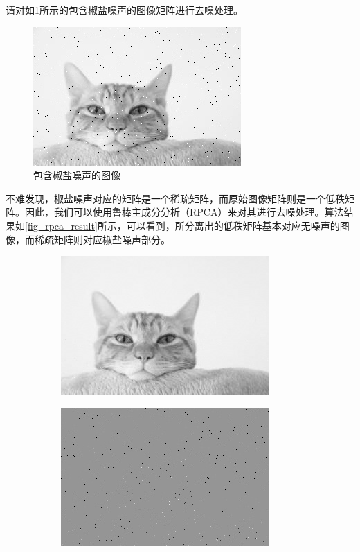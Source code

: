 \begin{example}
    请对如\cref{fig_rpca_example}所示的包含椒盐噪声的图像矩阵进行去噪处理。
    \begin{figure}[htb!]
        \centering
        \includegraphics[width=.3\textwidth]{./img/matrix/cat_noisy.jpg}
        \caption{包含椒盐噪声的图像}
        \label{fig_rpca_example}
    \end{figure}
\end{example}
\begin{solution}
    不难发现，椒盐噪声对应的矩阵是一个稀疏矩阵，而原始图像矩阵则是一个低秩矩阵。因此，我们可以使用鲁棒主成分分析（RPCA）来对其进行去噪处理。算法结果如\cref{fig_rpca_result}所示，可以看到，所分离出的低秩矩阵基本对应无噪声的图像，而稀疏矩阵则对应椒盐噪声部分。
    \begin{figure}[htb!]
        \centering
        \begin{subfigure}{.3\textwidth}
            \centering
            \includegraphics[width=.9\textwidth]{./img/matrix/cat_low_rank.jpg}
            \caption{}
            \label{fig_rpca_result_1}
        \end{subfigure}
        \begin{subfigure}{.3\textwidth}
            \centering
            \includegraphics[width=.9\textwidth]{./img/matrix/cat_sparse.jpg}

\end{subfigure}
\end{figure}
\end{solution}
